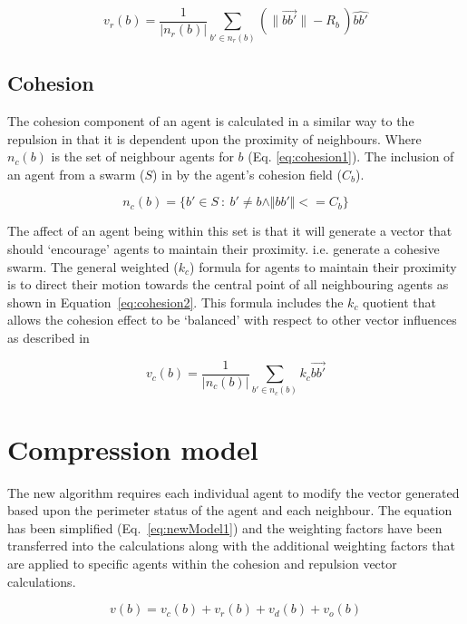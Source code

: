 \documentclass[12pt,a4paper]{IEEEtran}
\newcommand{\magn}[1]{\Vert{#1}\Vert}
\begin{document}
\begin{equation}\label{eq:repulsion2a}
v_r(b) = \frac{1}{\lvert n_r(b)\rvert}\sum_{b' \in n_r(b)} \left(\lVert\vec{b b'}\rVert - R_b \, \right)\widehat{bb'}
\end{equation}

\subsection{Cohesion}\label{cohesion}
The cohesion component of an agent is calculated in a similar way to the repulsion in that it is dependent upon the proximity of neighbours. Where $n_c(b)$ is the set of neighbour agents for $b$ (Eq. \ref{eq:cohesion1}). The inclusion of an agent from a swarm ($S$) in by the agent's cohesion field ($C_b$).

\begin{equation}\label{eq:cohesion1}
n_c(b) = \{b' \in S~:~b' \neq b \land\magn{bb'} <= C_b\}
\end{equation}

The affect of an agent being within this set is that it will generate a vector that should `encourage' agents to maintain their proximity. i.e. generate a cohesive swarm. The general weighted ($k_c$) formula for agents to maintain their proximity is to direct their motion towards the central point of all neighbouring agents as shown in Equation~\ref{eq:cohesion2}. This formula includes the $k_c$ quotient that allows the cohesion effect to be `balanced' with respect to other vector influences as described in ~\cite{eliot2017methods,eliot2018metric,eliot2019void} 

\begin{equation}\label{eq:cohesion2}
v_c(b) = \frac{1}{\lvert n_c(b)\rvert} \sum_{b' \in n_c(b)}k_c\vec{b b'}
\end{equation}

\section{Compression model}
The new algorithm requires each individual agent to modify the vector generated based upon the perimeter status of the agent and each neighbour. The equation has been simplified (Eq.~\ref{eq:newModel1}) and the weighting factors have been transferred into the calculations along with the additional weighting factors that are applied to specific agents within the cohesion and repulsion vector calculations.

\begin{equation}\label{eq:newModel1}
v(b) = v_c(b) + v_r(b) + v_d(b) + v_o(b)
\end{equation}
\end{document}
